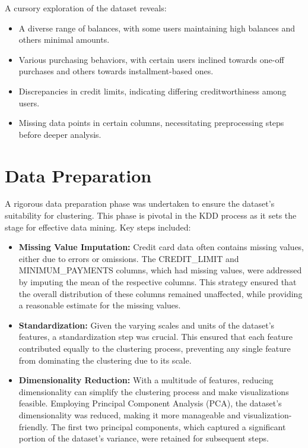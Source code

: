 \documentclass[12pt]{article}
\begin{document}
A cursory exploration of the dataset reveals:
\begin{itemize}
\item A diverse range of balances, with some users maintaining high balances and others minimal amounts.
\item Various purchasing behaviors, with certain users inclined towards one-off purchases and others towards installment-based ones.
\item Discrepancies in credit limits, indicating differing creditworthiness among users.
\item Missing data points in certain columns, necessitating preprocessing steps before deeper analysis.
\end{itemize}

\section{Data Preparation}

A rigorous data preparation phase was undertaken to ensure the dataset's suitability for clustering. This phase is pivotal in the KDD process as it sets the stage for effective data mining. Key steps included:

\begin{itemize}
    \item 
        \textbf{Missing Value Imputation:} Credit card data often contains missing values, either due to errors or omissions. The CREDIT\_LIMIT and MINIMUM\_PAYMENTS columns, which had missing values, were addressed by imputing the mean of the respective columns. This strategy ensured that the overall distribution of these columns remained unaffected, while providing a reasonable estimate for the missing values.
    \item 
        \textbf{Standardization:} Given the varying scales and units of the dataset's features, a standardization step was crucial. This ensured that each feature contributed equally to the clustering process, preventing any single feature from dominating the clustering due to its scale.

    \item 
        \textbf{Dimensionality Reduction:} With a multitude of features, reducing dimensionality can simplify the clustering process and make visualizations feasible. Employing Principal Component Analysis (PCA), the dataset's dimensionality was reduced, making it more manageable and visualization-friendly. The first two principal components, which captured a significant portion of the dataset's variance, were retained for subsequent steps.
    \end{itemize}
\end{document}
